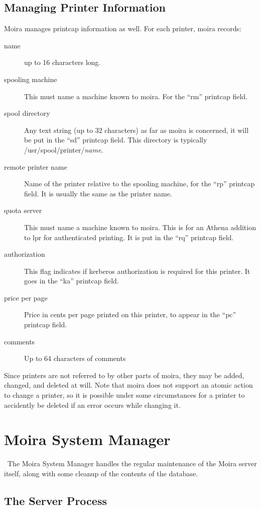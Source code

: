 \section{Managing Printer Information}

Moira manages printcap information as well.  For each printer, moira
records:
\begin{description}
\item[name] up to 16 characters long.
\item[spooling machine] This must name a machine known to moira.  For the
``rm'' printcap field.
\item[spool directory] Any text string (up to 32 characters) as far as moira
is concerned, it will be put in the ``sd'' printcap field.  This
directory is typically /usr/spool/printer/{\em name}.
\item[remote printer name] Name of the printer relative to the spooling
machine, for the ``rp'' printcap field.  It is usually the same as the
printer name. 
\item[quota server] This must name a machine known to moira.  This is for an
Athena addition to lpr for authenticated printing.  It is put in the
``rq'' printcap field.
\item[authorization] This flag indicates if kerberos authorization is
required for this printer.  It goes in the ``ka'' printcap field.
\item[price per page] Price in cents per page printed on this printer, to
appear in the ``pc'' printcap field.
\item[comments] Up to 64 characters of comments
\end{description}

Since printers are not referred to by other parts of moira, they may
be added, changed, and deleted at will.  Note that moira does not
support an atomic action to change a printer, so it is possible under
some circumstances for a printer to accidently be deleted if an error
occurs while changing it.


\chapter{Moira System Manager}

\athena\ The Moira System Manager handles the regular maintenance of
the Moira server itself, along with some cleanup of the contents of
the database.

\section{The Server Process}

